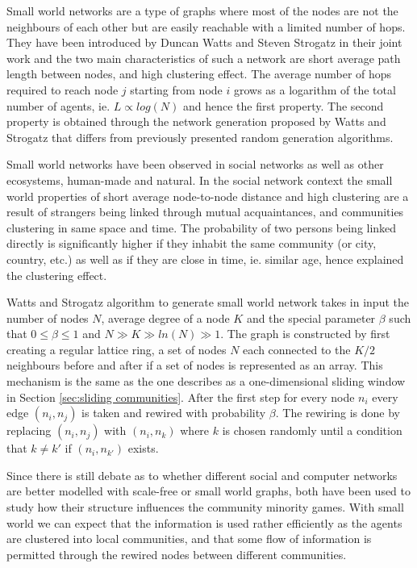 Small world networks are a type of graphs where most of the nodes are not the neighbours of each other but are easily reachable with a limited number of hops.
They have been introduced by Duncan Watts and Steven Strogatz in their joint work \cite{watts1998collective} and the two main characteristics of such a network are short average path length between nodes, and high clustering effect.
The average number of hops required to reach node $j$ starting from node $i$ grows as a logarithm of the total number of agents, ie. $L \propto log(N)$ and hence the first property.
The second property is obtained through the network generation proposed by Watts and Strogatz that differs from previously presented random generation algorithms.

Small world networks have been observed in social networks as well as other ecosystems, human-made and natural.
In the social network context the small world properties of short average node-to-node distance and high clustering are a result of strangers being linked through mutual acquaintances, and communities clustering in same space and time.
The probability of two persons being linked directly is significantly higher if they inhabit the same community (or city, country, etc.) as well as if they are close in time, ie. similar age, hence explained the clustering effect.

Watts and Strogatz algorithm to generate small world network takes in input the number of nodes $N$, average degree of a node $K$ and the special parameter $\beta$ such that $0\leq \beta \leq 1$ and $N\gg K\gg ln(N) \gg 1$.
The graph is constructed by first creating a regular lattice ring, a set of nodes $N$ each connected to the $K/2$ neighbours before and after if a set of nodes is represented as an array.
This mechanism is the same as the one describes as a one-dimensional sliding window in Section \ref{sec:sliding communities}.
After the first step for every node $n_i$ every edge $(n_i,n_j)$ is taken and rewired with probability $\beta$. The rewiring is done by replacing $(n_i,n_j)$ with $(n_i,n_k)$ where $k$ is chosen randomly until a condition that $k\neq k'$ if $(n_i,n_{k'})$ exists.

Since there is still debate as to whether different social and computer networks are better modelled with scale-free or small world graphs, both have been used to study how their structure influences the community minority games.
With small world we can expect that the information is used rather efficiently as the agents are clustered into local communities, and that some flow of information is permitted through the rewired nodes between different communities.

